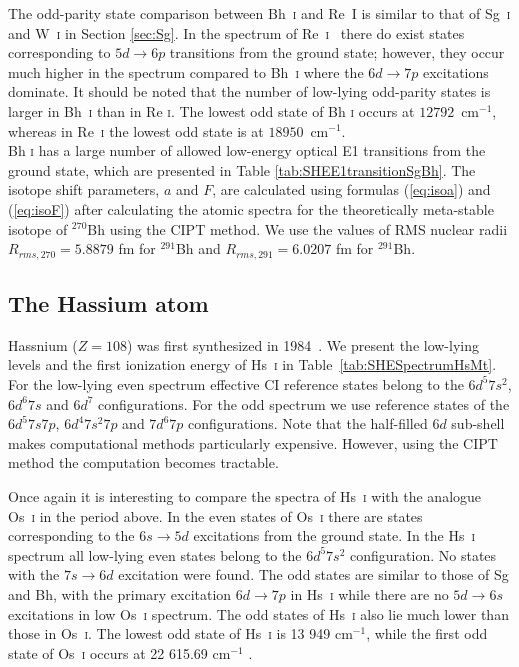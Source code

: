 \documentclass[10pt,a4paper, twoside]{report}
\begin{document}
 The odd-parity state comparison between Bh~\textsc{i} and Re~\textsc{I} is similar to that of Sg~\textsc{i} and W~\textsc{i} in Section \ref{sec:Sg}. In the spectrum of Re~\textsc{i}~\cite{NIST_ASD} there do exist states corresponding to  $5d \rightarrow 6p$ transitions from the ground state; however, they occur much higher in the spectrum compared to Bh~\textsc{i} where the $6d \rightarrow 7p$ excitations dominate. It should be noted that the number of low-lying odd-parity states is larger in Bh~\textsc{i} than in Re \textsc{i}. The lowest odd state of Bh \textsc{i} occurs at $12 792$~cm$^{-1}$, whereas in Re~\textsc{i} the lowest odd state is at $18 950$~cm$^{-1}$.\\
 \linebreak
 Bh \textsc{i} has a large number of allowed low-energy optical E1 transitions from the ground state, which are presented  in Table \ref{tab:SHEE1transitionSgBh}. The isotope shift parameters, $a$ and $F$, are calculated using formulas (\ref{eq:isoa}) and (\ref{eq:isoF}) after calculating the atomic spectra for the theoretically meta-stable isotope of $^{270}$Bh using the CIPT method. We use the values of RMS nuclear radii  $ R_{rms,\text{270}} =  5.8879$ fm for $^{291}$Bh and $R_{rms,\text{291}} = 6.0207$ fm  for $^{291}$Bh.
 
\subsection{The Hassium atom} \label{sec:Hs}

Hassnium ($Z=108$) was first synthesized in 1984~\cite{Munzenberg1984}. We present the low-lying levels and the first ionization energy of Hs~\textsc{i} in Table~\ref{tab:SHESpectrumHsMt}. For the low-lying even spectrum effective CI reference states belong to the $6d^5 7s^2$, $6d^6 7s$ and $6d^7$ configurations. For the odd spectrum we use reference states of the $6d^5 7s 7p$, $6d^4 7s^2 7p$ and $7d^6 7p$ configurations.  Note that the half-filled $6d$ sub-shell makes computational methods particularly expensive. However, using the CIPT method the computation becomes tractable.  

Once again it is interesting to compare the spectra of Hs~\textsc{i} with the analogue Os~\textsc{i} in the period above. In the even states of Os~\textsc{i} there are states corresponding to the $6s \rightarrow 5d$ excitations from the ground state. In the Hs~\textsc{i} spectrum all low-lying even states belong to the  $6d^5 7s^2$ configuration. No states with the $7s \rightarrow 6d$ excitation were found. The odd states are similar to those of Sg and Bh, with the primary excitation $6d \rightarrow 7p$ in Hs~\textsc{i} while there are no  $5d \rightarrow 6s$ excitations in low Os~\textsc{i} spectrum. The odd states of Hs~\textsc{i} also lie much lower than those in Os~\textsc{i}.  The lowest odd state of Hs~\textsc{i} is 13 949 cm$^{-1}$, while the first odd state of Os~\textsc{i} occurs at 22 615.69 cm$^{-1}$ \cite{NIST_ASD}. 
\end{document}
